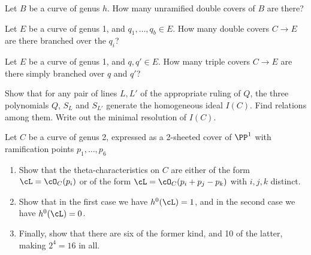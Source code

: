 \begin{exercise}
Let $B$ be a curve of genus $h$. How many unramified double covers of $B$ are there? 
\end{exercise}


\begin{exercise} Let $E$ be a curve of genus 1, and $q_1,\dots,q_b \in E$. How many double covers $C \to E$ are there branched over the $q_i$?
\end{exercise}


\begin{exercise} Let $E$ be a curve of genus 1, and $q, q' \in E$. How many triple covers $C \to E$ are there simply branched over $q$ and $q'$?
\end{exercise}

\begin{exercise}\label{ideal of genus 2 degree 5} 
Show that for any pair of lines $L, L'$ of the appropriate ruling of $Q$, the three polynomials $Q$, $S_L$ and $S_{L'}$ generate the homogeneous ideal $I(C)$. Find relations among them. Write out the minimal resolution of $I(C)$.
\end{exercise}

\begin{exercise}\label{theta char on genus 2}
 Let $C$ be a curve of genus 2, expressed as a 2-sheeted cover of $\PP^1$ with ramification points $p_1,\dots,p_6$
 \begin{enumerate}
 \item Show that the theta-characteristics on $C$ are either of the form $\cL = \cO_C(p_i)$ or of the form $\cL = \cO_C(p_i + p_j - p_k)$ with $i, j, k$ distinct. 
 \item Show that in the first case we have $h^0(\cL) = 1$, and in the second case we have $h^0(\cL) = 0$. 
 \item Finally, show that there are six of the former kind, and 10 of the latter, making $2^4 = 16$ in all.
 \end{enumerate}
 \end{exercise}
 

